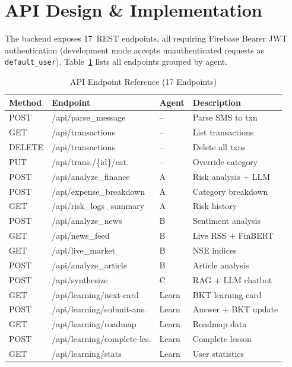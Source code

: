 \documentclass[conference]{IEEEtran}
\begin{document}
\section{API Design \& Implementation}

The backend exposes 17~REST endpoints, all requiring Firebase Bearer JWT authentication (development mode accepts unauthenticated requests as \texttt{default\_user}). Table~\ref{tab:api} lists all endpoints grouped by agent.

\begin{table}[!t]
\centering
\caption{API Endpoint Reference (17 Endpoints)}
\label{tab:api}
\renewcommand{\arraystretch}{1.1}
\scriptsize
\begin{tabular}{l l l p{2.4cm}}
\toprule
\textbf{Method} & \textbf{Endpoint} & \textbf{Agent} & \textbf{Description} \\
\midrule
POST   & /api/parse\_message        & --    & Parse SMS to txn \\
GET    & /api/transactions          & --    & List transactions \\
DELETE & /api/transactions          & --    & Delete all txns \\
PUT    & /api/trans./\{id\}/cat.    & --    & Override category \\
POST   & /api/analyze\_finance      & A     & Risk analysis + LLM \\
POST   & /api/expense\_breakdown    & A     & Category breakdown \\
GET    & /api/risk\_logs\_summary    & A     & Risk history \\
POST   & /api/analyze\_news         & B     & Sentiment analysis \\
GET    & /api/news\_feed            & B     & Live RSS + FinBERT \\
GET    & /api/live\_market          & B     & NSE indices \\
POST   & /api/analyze\_article      & B     & Article analysis \\
POST   & /api/synthesize            & C     & RAG + LLM chatbot \\
GET    & /api/learning/next-card    & Learn & BKT learning card \\
POST   & /api/learning/submit-ans.  & Learn & Answer + BKT update \\
GET    & /api/learning/roadmap      & Learn & Roadmap data \\
POST   & /api/learning/complete-les.& Learn & Complete lesson \\
GET    & /api/learning/stats        & Learn & User statistics \\
\bottomrule
\end{tabular}
\end{table}
\end{document}
